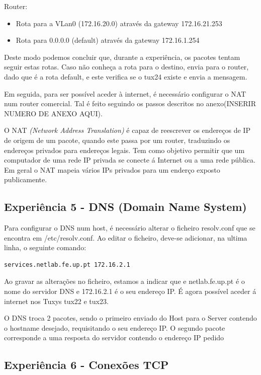 \documentclass[11pt]{article}
\begin{document}
Router:
\begin{itemize}
\item Rota para a VLan0 (172.16.20.0) através da gateway 172.16.21.253
\item Rota para 0.0.0.0 (default) através da gateway 172.16.1.254
\end{itemize}

Deste modo podemos concluir que, durante a experiência, os pacotes tentam seguir estas rotas. Caso não conheça a rota para o destino, envia para o router, dado que é a rota default, e este verifica se o tux24 existe e envia a mensagem. 

Em seguida, para ser possível aceder à internet, é necessário configurar o NAT num router comercial. Tal é feito seguindo os passos descritos no anexo(INSERIR NUMERO DE ANEXO AQUI).


O NAT \emph{(Network Address Translation)} é capaz de reescrever os endereços de IP de origem de um pacote, quando este passa por um router, traduzindo os endereços privados para endereços legais. Tem como objetivo permitir que um computador de uma rede IP privada se conecte á Internet ou a uma rede pública. Em geral o NAT mapeia vários IPs privados para um enderço exposto publicamente.

\subsection{Experiência 5 - DNS (Domain Name System)}

Para configurar o DNS num host, é necessário alterar o ficheiro resolv.conf que se encontra em /etc/resolv.conf. Ao editar o ficheiro, deve-se adicionar, na ultima linha, o seguinte comando:

\begin{lstlisting}[language=bash]
    services.netlab.fe.up.pt 172.16.2.1
\end{lstlisting}

Ao gravar as alterações no ficheiro, estamos a indicar que e netlab.fe.up.pt é o nome do servidor DNS e 172.16.2.1 é o seu endereço IP. É agora possível aceder á internet nos Tuxys tux22 e tux23.

O DNS troca 2 pacotes, sendo o primeiro enviado do Host para o Server contendo o hostname desejado, requisitando o seu endereço IP. O segundo pacote corresponde a uma resposta do servidor contendo o endereço IP pedido

\subsection{Experiência 6 - Conexões TCP}
\end{document}
